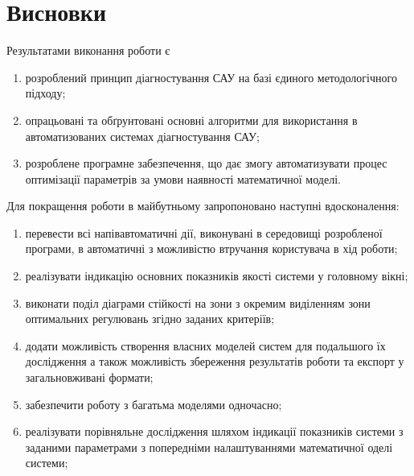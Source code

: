 \section*{Висновки}

Результатами виконання роботи є

\begin{enumerate}
 \item розроблений принцип діагностування САУ на базі єдиного методологічного підходу;
 \item опрацьовані та обґрунтовані основні алгоритми для використання в автоматизованих системах діагностування САУ;
 \item розроблене програмне забезпечення, що дає змогу автоматизувати процес оптимізації параметрів за умови наявності математичної моделі.
\end{enumerate}

Для покращення роботи в майбутньому запропоновано наступні вдосконалення:

\begin{enumerate}
 \item перевести всі напівавтоматичні дії, виконувані в середовищі розробленої програми, в автоматичні з можливістю втручання користувача в хід роботи;
 \item реалізувати індикацію основних показників якості системи у головному вікні; 
 \item виконати поділ діаграми стійкості на зони з окремим виділенням зони оптимальних регулювань згідно заданих критеріїв;
 \item додати можливість створення власних моделей систем для подальшого їх дослідження а також можливість збереження результатів роботи та експорт у загальновживані формати;
 \item забезпечити роботу з багатьма моделями одночасно;
 \item реалізувати порівняльне дослідження шляхом індикації показників системи з заданими параметрами з попередніми налаштуваннями математичної оделі системи;
\end{enumerate}
